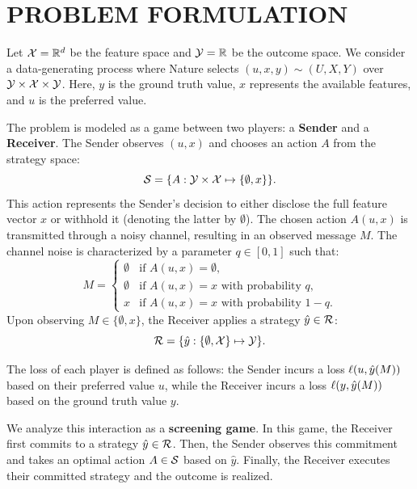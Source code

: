 \section{PROBLEM FORMULATION}
\label{sec:problem_formulation}

Let $\mathcal{X} = \mathbb{R}^d$ be the feature space and $\mathcal{Y} = \mathbb{R}$ be the outcome space. We consider a data-generating process where Nature selects $(u, x, y) \sim (U, X, Y)$ over $\mathcal{Y} \times \mathcal{X} \times \mathcal{Y}$. Here, $y$ is the ground truth value, $x$ represents the available features, and $u$ is the preferred value.

The problem is modeled as a game between two players: a \textbf{Sender} and a \textbf{Receiver}. The Sender observes $(u, x)$ and chooses an action $A$ from the strategy space:
\begin{equation*}
  \mathcal{S} = \{ A : \mathcal{Y} \times \mathcal{X} \mapsto \{\emptyset, x\} \}.
\end{equation*}
This action represents the Sender's decision to either disclose the full feature vector $x$ or withhold it (denoting the latter by $\emptyset$). The chosen action $A(u, x)$ is transmitted through a noisy channel, resulting in an observed message $M$. The channel noise is characterized by a parameter $q \in [0, 1]$ such that:
\begin{equation*}
  M = \begin{cases}
  \emptyset & \text{if } A(u,x) = \emptyset, \\
  \emptyset & \text{if } A(u,x) = x \text{ with probability } q, \\
  x & \text{if } A(u,x) = x \text{ with probability } 1-q.
  \end{cases}
\end{equation*}
Upon observing $M \in \{\emptyset, x\}$, the Receiver applies a strategy $\hat{y} \in \mathcal{R}$:
\begin{equation*}
  \mathcal{R} = \{ \hat{y} : \{\emptyset, \mathcal{X}\} \mapsto \mathcal{Y} \}.
\end{equation*}

The loss of each player is defined as follows: the Sender incurs a loss $\ell(u, \hat{y}(M))$ based on their preferred value $u$, while the Receiver incurs a loss $\ell(y, \hat{y}(M))$ based on the ground truth value $y$. 

We analyze this interaction as a \textbf{screening game}. In this game, the Receiver first commits to a strategy $\hat{y} \in \mathcal{R}$. Then, the Sender observes this commitment and takes an optimal action $A \in \mathcal{S}$ based on $\hat{y}$. Finally, the Receiver executes their committed strategy and the outcome is realized.

